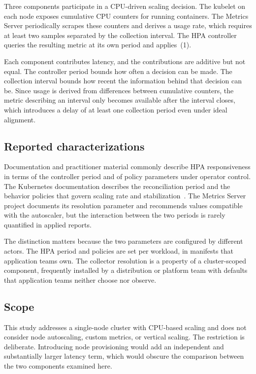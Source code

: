 \documentclass[conference]{IEEEtran}
\begin{document}
Three components participate in a CPU-driven scaling decision. The kubelet on
each node exposes cumulative CPU counters for running containers. The Metrics
Server periodically scrapes these counters and derives a usage rate, which
requires at least two samples separated by the collection interval. The HPA
controller queries the resulting metric at its own period and applies~(1).

Each component contributes latency, and the contributions are additive but not
equal. The controller period bounds how often a decision can be made. The
collection interval bounds how recent the information behind that decision can
be. Since usage is derived from differences between cumulative counters, the
metric describing an interval only becomes available after the interval closes,
which introduces a delay of at least one collection period even under ideal
alignment.

\subsection{Reported characterizations}

Documentation and practitioner material commonly describe HPA responsiveness in
terms of the controller period and of policy parameters under operator control.
The Kubernetes documentation describes the reconciliation period and the
behavior policies that govern scaling rate and stabilization~\cite{k8shpa}. The
Metrics Server project documents its resolution parameter and recommends values
compatible with the autoscaler, but the interaction between the two periods is
rarely quantified in applied reports.

The distinction matters because the two parameters are configured by different
actors. The HPA period and policies are set per workload, in manifests that
application teams own. The collector resolution is a property of a
cluster-scoped component, frequently installed by a distribution or platform
team with defaults that application teams neither choose nor observe.

\subsection{Scope}

This study addresses a single-node cluster with CPU-based scaling and does not
consider node autoscaling, custom metrics, or vertical scaling. The restriction
is deliberate. Introducing node provisioning would add an independent and
substantially larger latency term, which would obscure the comparison between
the two components examined here.
\end{document}
